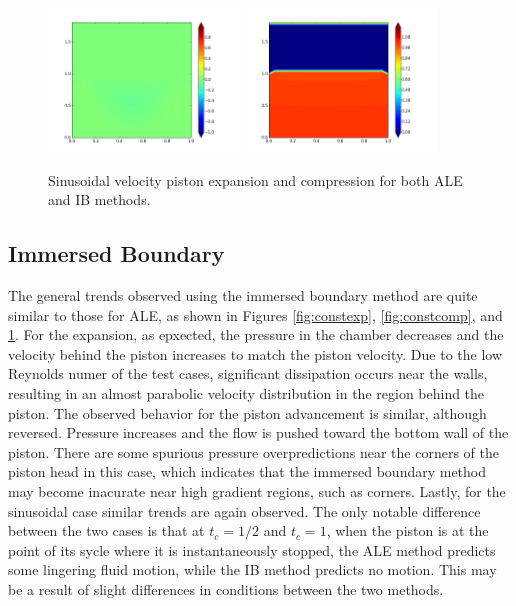 \documentclass{article}
\begin{document}
\begin{figure}
{\includegraphics[width=2in]{contour-V100-IBsin.png} \hspace{-20pt}
\includegraphics[width=2in]{contour-P100-IBsin.png} 
}
\caption{\label{fig:sinusoid} Sinusoidal velocity piston expansion and compression for both ALE and IB methods.} 
\end{figure}
%

\subsection{Immersed Boundary}

The general trends observed using the immersed boundary method are quite similar to those for ALE, as shown in Figures \ref{fig:constexp}, \ref{fig:constcomp}, and \ref{fig:sinusoid}. For the expansion, as epxected, the pressure in the chamber decreases and the velocity behind the piston increases to match the piston velocity. Due to the low Reynolds numer of the test cases, significant dissipation occurs near the walls, resulting in an almost parabolic velocity distribution in the region behind the piston. The observed behavior for the piston advancement is similar, although reversed. Pressure increases and the flow is pushed toward the bottom wall of the piston. There are some spurious pressure overpredictions near the corners of the piston head in this case, which indicates that the immersed boundary method may become inacurate near high gradient regions, such as corners. Lastly, for the sinusoidal case similar trends are again observed. The only notable difference between the two cases is that at $t_c = 1/2$ and $t_c = 1$, when the piston is at the point of its sycle where it is instantaneously stopped, the ALE method predicts some lingering fluid motion, while the IB method predicts no motion. This may be a result of slight differences in conditions between the two methods. 
\end{document}
